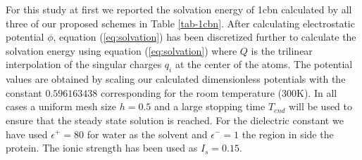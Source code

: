  For this study at first we reported the solvation energy of 1cbn calculated by all three of our proposed schemes in Table \ref{tab-1cbn}. After calculating electrostatic potential $\phi$, equation (\ref{eq:solvation}) has been discretized further to calculate the solvation energy using equation (\ref{eq:solvation}) where $Q$ is the trilinear interpolation of the singular charges $q_i$ at the center of the atoms.  The potential values are obtained by scaling our calculated dimensionless potentials with the constant $0.596163438$ corresponding for the room temperature (300K). In all cases a uniform mesh size $h = 0.5$ and a large stopping time $T_{end}$ will be used to ensure that the steady state solution is reached. For the dielectric constant we have used $\epsilon^+=80$ for water as the solvent and $\epsilon ^-=1$ the region in side the protein. The ionic strength has been used as $I_s = 0.15$.
